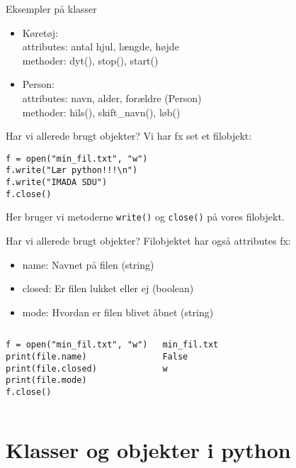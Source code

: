 \begin{frame}{Eksempler på klasser}
	\begin{itemize}
		\item Køretøj: \\
			attributes: antal hjul, længde, højde\\
			methoder: dyt(), stop(), start()
		\item Person: \\
			attributes: navn, alder, forældre (Person)\\
			methoder: hils(), skift\_navn(), løb()
	\end{itemize}
\end{frame}


\begin{frame}[fragile]{Har vi allerede brugt objekter?}
	\pause
	Vi har fx set et filobjekt:
	\begin{lstlisting}[style=python]
f = open("min_fil.txt", "w")
f.write("Lær python!!!\n")
f.write("IMADA SDU")
f.close()
	\end{lstlisting}
	Her bruger vi metoderne \texttt{write()} og \texttt{close()} på vores filobjekt.\\
\end{frame}


\begin{frame}[fragile]{Har vi allerede brugt objekter?}
		Filobjektet har også attributes fx:
	\begin{itemize}
		\item name: Navnet på filen (string)
		\item closed: Er filen lukket eller ej (boolean)
		\item mode: Hvordan er filen blivet åbnet (string)
	\end{itemize}
	\begin{columns}
		\begin{lstlisting}[style=python]
f = open("min_fil.txt", "w")
print(file.name)
print(file.closed)
print(file.mode)
f.close()
		\end{lstlisting}
		\begin{lstlisting}[style=python]
min_fil.txt
False
w
		\end{lstlisting}
	\end{columns}
\end{frame}

\section{Klasser og objekter i python}


